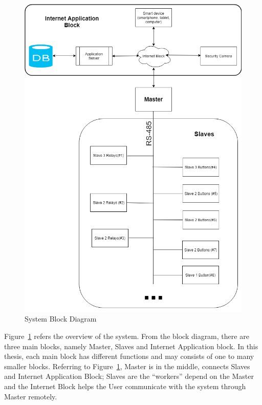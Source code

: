     \begin{figure}[!htp]
        \begin{center}
        \includegraphics[scale=0.6]{images/blockDiagram.PNG}
        \caption{System Block Diagram}
        \label{fig:blockDiagram}
        \end{center}
    \end{figure}
    Figure~\ref{fig:blockDiagram} refers the overview of the system. From the block diagram, there are three main blocks, namely Master, Slaves and Internet Application block. In this thesis, each main block has different functions and may consists of one to many smaller blocks. Referring to Figure~\ref{fig:blockDiagram}, Master is in the middle, connects Slaves and Internet Application Block; Slaves are the “workers” depend on the Master and the Internet Block helps the User communicate with the system through Master remotely.
